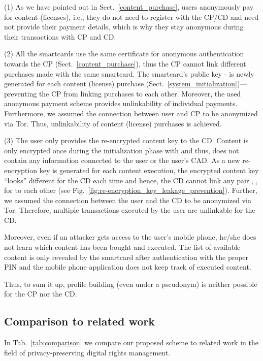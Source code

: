 \documentclass{llncs}
\newcommand{\refSec}[1]{Sect.~\ref{#1}}
\newcommand{\refFig}[1]{Fig.~\ref{#1}}
\newcommand{\refTable}[1]{Tab.~\ref{#1}}
\begin{document}
(1) As we have pointed out in \refSec{content_purchase}, users anonymously pay for content (licenses), i.e., they do not need to register with the CP/CD and need not provide their payment details, which is why they stay anonymous during their transactions with CP and CD.

(2) All the smartcards use the same certificate for anonymous authentication towards the CP (\refSec{content_purchase}), thus the CP cannot link different purchases made with the same smartcard. The smartcard's public key - is newly generated for each content (license) purchase (\refSec{system_initialization})---preventing the CP from linking purchases to each other. Moreover, the used anonymous payment scheme \cite{Tewari1998} provides unlinkability of individual payments. Furthermore, we assumed the connection between user and CP to be anonymized via Tor. Thus, unlinkability of content (license) purchases is achieved. 

(3) The user only provides the re-encrypted content key to the CD. Content  is only encrypted once during the initialization phase with  and thus,  does not contain any information connected to the user or the user's CAD. As a new re-encryption key is generated for each content execution, the encrypted content key ``looks'' different for the CD each time and hence, the CD cannot link any pair , , for  to each other (see \refFig{fig:re-encryption_key_leakage_prevention}). Further, we assumed the connection between the user and the CD to be anonymized via Tor. Therefore, multiple transactions executed by the user are unlinkable for the CD.

Moreover, even if an attacker gets access to the user's mobile phone, he/she does not learn which content has been bought and executed. The list of available content is only revealed by the smartcard after authentication with the proper PIN and the mobile phone application does not keep track of executed content. 

Thus, to sum it up, profile building (even under a pseudonym) is neither possible for the CP nor the CD.

\subsection{Comparison to related work} \label{comparison}


In \refTable{tab:comparison} we compare our proposed scheme to related work in the field of privacy-preserving digital rights management. 
\end{document}
